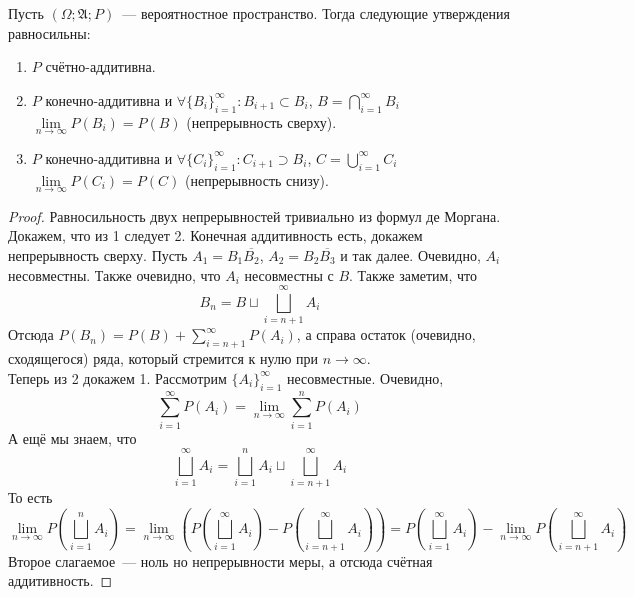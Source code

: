 \documentclass{article}
\newcommand{\A}{{\mathfrak A}}
\begin{document}
    \begin{theorem}
        Пусть $(\Omega;\A;P)$~--- вероятностное пространство. Тогда следующие утверждения равносильны:
        \begin{enumerate}
            \item $P$ счётно-аддитивна.
            \item $P$ конечно-аддитивна и $\forall \{B_i\}_{i=1}^\infty:B_{i+1}\subset B_i$, $B=\bigcap\limits_{i=1}^\infty B_i$ $\lim\limits_{n\to\infty}P(B_i)=P(B)$ (непрерывность сверху).
            \item $P$ конечно-аддитивна и $\forall \{C_i\}_{i=1}^\infty:C_{i+1}\supset B_i$, $C=\bigcup\limits_{i=1}^\infty C_i$ $\lim\limits_{n\to\infty}P(C_i)=P(C)$ (непрерывность снизу).
        \end{enumerate}
    \end{theorem}
    \begin{proof}
        Равносильность двух непрерывностей тривиально из формул де Моргана.\\
        Докажем, что из 1 следует 2. Конечная аддитивность есть, докажем непрерывность сверху. Пусть $A_1=B_1\overline{B_2}$, $A_2=B_2\overline{B_3}$ и так далее. Очевидно, $A_i$ несовместны. Также очевидно, что $A_i$ несовместны с $B$. Также заметим, что
        $$
        B_n=B\sqcup\bigsqcup\limits_{i=n+1}^\infty A_i
        $$
        Отсюда $P(B_n)=P(B)+\sum\limits_{i=n+1}^\infty P(A_i)$, а справа остаток (очевидно, сходящегося) ряда, который стремится к нулю при $n\to\infty$.\\
        Теперь из 2 докажем 1. Рассмотрим $\{A_i\}_{i=1}^\infty$ несовместные. Очевидно,
        $$
        \sum\limits_{i=1}^\infty P(A_i)=\lim\limits_{n\to\infty}\sum\limits_{i=1}^nP(A_i)
        $$
        А ещё мы знаем, что
        $$
        \bigsqcup\limits_{i=1}^\infty A_i=\bigsqcup\limits_{i=1}^nA_i\sqcup\bigsqcup\limits_{i=n+1}^\infty A_i
        $$
        То есть
        $$
        \lim\limits_{n\to\infty}P\left(\bigsqcup\limits_{i=1}^nA_i\right)=
        \lim\limits_{n\to\infty}\left(P\left(\bigsqcup\limits_{i=1}^\infty A_i\right)-P\left(\bigsqcup\limits_{i=n+1}^\infty A_i\right)\right)=
        P\left(\bigsqcup\limits_{i=1}^\infty A_i\right)-\lim\limits_{n\to\infty}P\left(\bigsqcup\limits_{i=n+1}^\infty A_i\right)
        $$
        Второе слагаемое~--- ноль но непрерывности меры, а отсюда счётная аддитивность.
    \end{proof}
\end{document}
